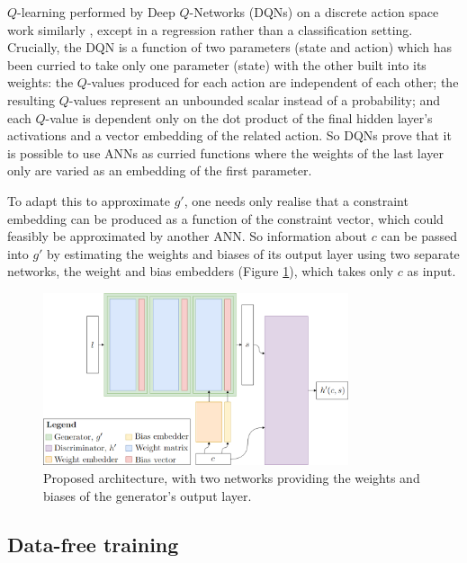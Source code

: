 \documentclass[../../main.tex]{subfiles}
\begin{document}
$Q$-learning performed by Deep $Q$-Networks (DQNs) on a discrete action space work similarly \cite{mnih15}, except in a regression rather than a classification setting.
Crucially, the DQN is a function of two parameters (state and action) which has been curried to take only one parameter (state) with the other built into its weights: the $Q$-values produced for each action are independent of each other; the resulting $Q$-values represent an unbounded scalar instead of a probability; and each $Q$-value is dependent only on the dot product of the final hidden layer's activations and a vector embedding of the related action.
So DQNs prove that it is possible to use ANNs as curried functions where the weights of the last layer only are varied as an embedding of the first parameter.

To adapt this to approximate $g'$, one needs only realise that a constraint embedding can be produced as a function of the constraint vector, which could feasibly be approximated by another ANN.
So information about $c$ can be passed into $g'$ by estimating the weights and biases of its output layer using two separate networks, the weight and bias embedders (Figure \ref{fig:curriedGenerator}), which takes only $c$ as input.
\begin{figure}[H]
    \begin{center}
    \includegraphics[width=0.8\textwidth]{curriedGenerator}
    \caption{
		Proposed architecture, with two networks providing the weights and biases of the generator's output layer.
    }
    \label{fig:curriedGenerator}
    \end{center}
\end{figure}

\subsection{Data-free training} \label{subsection:dataFreeTraining}
\end{document}
